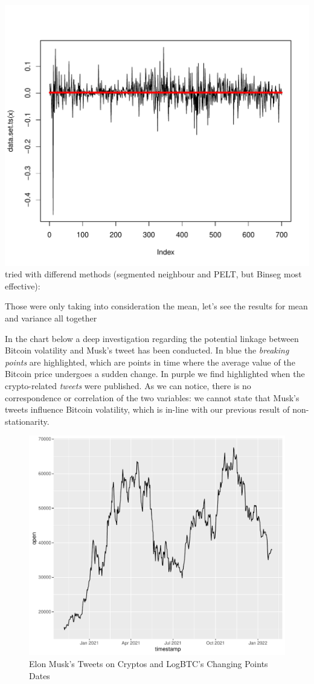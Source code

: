 \documentclass[
]{article}
\begin{document}
\includegraphics{Trial1_files/figure-latex/fig17-1.pdf} tried with
differend methods (segmented neighbour and PELT, but Binseg most
effective):

Those were only taking into consideration the mean, let's see the
results for mean and variance all together

In the chart below a deep investigation regarding the potential linkage
between Bitcoin volatility and Musk's tweet has been conducted. In blue
the \emph{breaking points} are highlighted, which are points in time
where the average value of the Bitcoin price undergoes a sudden change.
In purple we find highlighted when the crypto-related \emph{tweets} were
published. As we can notice, there is no correspondence or correlation
of the two variables: we cannot state that Musk's tweets influence
Bitcoin volatility, which is in-line with our previous result of
non-stationarity.

\begin{figure}
\centering
\includegraphics{Trial1_files/figure-latex/fig25-1.pdf}
\caption{\label{fig:fig25}Elon Musk's Tweets on Cryptos and LogBTC's
Changing Points Dates}
\end{figure}
\end{document}
